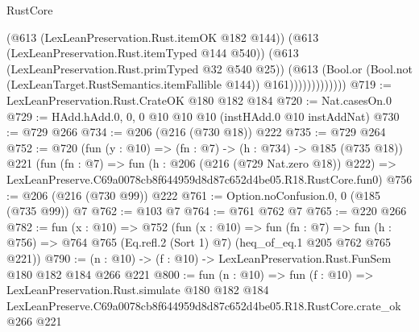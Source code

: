 \begin{lexlean}{RustCore}
\begin{coremodule}
                          (@613 (LexLeanPreservation.Rust.itemOK @182 @144))
                          (@613 (LexLeanPreservation.Rust.itemTyped @144 @540))
                          (@613 (LexLeanPreservation.Rust.primTyped @32 @540 @25))
                          (@613
                            (Bool.or
                              (Bool.not (LexLeanTarget.RustSemantics.itemFallible @144))
                              @161)))))))))))))
@719 := LexLeanPreservation.Rust.CrateOK @180 @182 @184
@720 := Nat.casesOn.{0}
@729 := HAdd.hAdd.{0, 0, 0} @10 @10 @10 (instHAdd.{0} @10 instAddNat)
@730 := @729 @266
@734 := @206 (@216 (@730 @18)) @222
@735 := @729 @264
@752 := @720
    (fun (y : @10) => (fn : @7) -> (h : @734) -> @185 (@735 @18))
    @221
    (fun (fn : @7) =>
    fun (h : @206 (@216 (@729 Nat.zero @18)) @222) =>
    LexLeanPreserve.C69a0078cb8f644959d8d87c652d4be05.R18.RustCore.fun0)
@756 := @206 (@216 (@730 @99)) @222
@761 := Option.noConfusion.{0, 0} (@185 (@735 @99)) @7
@762 := @103 @7
@764 := @761 @762 @7
@765 := @220 @266
@782 := fun (x : @10) =>
  @752
    (fun (x : @10) =>
    fun (fn : @7) =>
    fun (h : @756) => @764 @765 (Eq.refl.{2} (Sort 1) @7) (heq_of_eq.{1} @205 @762 @765 @221))
@790 := (n : @10) -> (f : @10) -> LexLeanPreservation.Rust.FunSem @180 @182 @184 @266 @221
@800 := fun (n : @10) =>
  fun (f : @10) =>
  LexLeanPreservation.Rust.simulate
    @180
    @182
    @184
    LexLeanPreserve.C69a0078cb8f644959d8d87c652d4be05.R18.RustCore.crate_ok
    @266
    @221
\end{coremodule}
\end{lexlean}
